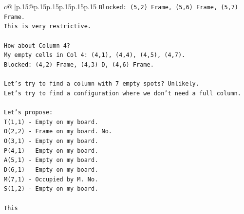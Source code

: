 \documentclass{article}
\begin{document}
{\begin{supertabular}{c@{$\;$}|p{.15\linewidth}@{}p{.15\linewidth}p{.15\linewidth}p{.15\linewidth}p{.15\linewidth}p{.15\linewidth}}
{{{\texttt{Blocked: (5,2) Frame, (5,6) Frame, (5,7) Frame.} \\
\texttt{This is very restrictive.} \\
\\ 
\texttt{How about Column 4?} \\
\texttt{My empty cells in Col 4: (4,1), (4,4), (4,5), (4,7).} \\
\texttt{Blocked: (4,2) Frame, (4,3) D, (4,6) Frame.} \\
\\ 
\texttt{Let's try to find a column with 7 empty spots? Unlikely.} \\
\texttt{Let's try to find a configuration where we don't need a full column.} \\
\\ 
\texttt{Let's propose:} \\
\texttt{T(1,1) {-} Empty on my board.} \\
\texttt{O(2,2) {-} Frame on my board. No.} \\
\texttt{O(3,1) {-} Empty on my board.} \\
\texttt{P(4,1) {-} Empty on my board.} \\
\texttt{A(5,1) {-} Empty on my board.} \\
\texttt{D(6,1) {-} Empty on my board.} \\
\texttt{M(7,1) {-} Occupied by M. No.} \\
\texttt{S(1,2) {-} Empty on my board.} \\
\\ 
\texttt{This} \\
            }
        }
    }
     \\ \\


\end{supertabular}}
\end{document}
